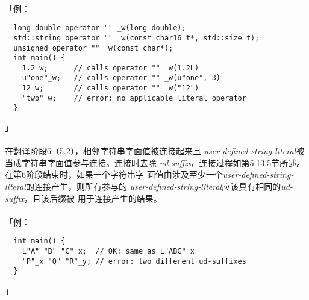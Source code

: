\paragraph{}
「例：
\begin{lstlisting}
  long double operator "" _w(long double);
  std::string operator "" _w(const char16_t*, std::size_t);
  unsigned operator "" _w(const char*);
  int main() {
    1.2_w;      // calls operator "" _w(1.2L)
    u"one"_w;   // calls operator "" _w(u"one", 3)
    12_w;       // calls operator "" _w("12")
    "two"_w;    // error: no applicable literal operator
  }
\end{lstlisting}」

\paragraph{}
在翻译阶段6（5.2），相邻字符串字面值被连接起来且
\textit{user-defined-string-literal}被当成字符串字面值参与连接。连接时去除
\textit{ud-suffix}，连接过程如第5.13.5节所述。在第6阶段结束时，如果一个字符串字
面值由涉及至少一个\textit{user-defined-string-literal}的连接产生，则所有参与的
\textit{user-defined-string-literal}应该具有相同的\textit{ud-suffix}，且该后缀被
用于连接产生的结果。

\paragraph{}
「例：
\begin{lstlisting}
  int main() {
    L"A" "B" "C"_x;  // OK: same as L"ABC"_x
    "P"_x "Q" "R"_y; // error: two different ud-suffixes
  }
\end{lstlisting}」
